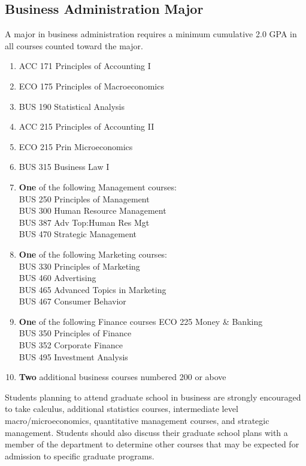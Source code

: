 \documentclass[
  letterpaper,
]{scrbook}
\providecommand{\tightlist}{%
  \setlength{\itemsep}{0pt}\setlength{\parskip}{0pt}}
\begin{document}
\subsection{Business Administration
Major}\label{business-administration-major}

A major in business administration requires a minimum cumulative 2.0 GPA
in all courses counted toward the major.

\begin{enumerate}
\def\labelenumi{\arabic{enumi}.}
\tightlist
\item
  ACC 171 Principles of Accounting I
\item
  ECO 175 Principles of Macroeconomics
\item
  BUS 190 Statistical Analysis
\item
  ACC 215 Principles of Accounting II
\item
  ECO 215 Prin Microeconomics
\item
  BUS 315 Business Law I
\item
  \textbf{One} of the following Management courses:\\
  BUS 250 Principles of Management\\
  BUS 300 Human Resource Management\\
  BUS 387 Adv Top:Human Res Mgt\\
  BUS 470 Strategic Management\\
\item
  \textbf{One} of the following Marketing courses:\\
  BUS 330 Principles of Marketing\\
  BUS 460 Advertising\\
  BUS 465 Advanced Topics in Marketing\\
  BUS 467 Consumer Behavior\\
\item
  \textbf{One} of the following Finance courses ECO 225 Money \&
  Banking\\
  BUS 350 Principles of Finance\\
  BUS 352 Corporate Finance\\
  BUS 495 Investment Analysis\\
\item
  \textbf{Two} additional business courses numbered 200 or above
\end{enumerate}

Students planning to attend graduate school in business are strongly
encouraged to take calculus, additional statistics courses, intermediate
level macro/microeconomics, quantitative management courses, and
strategic management. Students should also discuss their graduate school
plans with a member of the department to determine other courses that
may be expected for admission to specific graduate programs.
\end{document}
